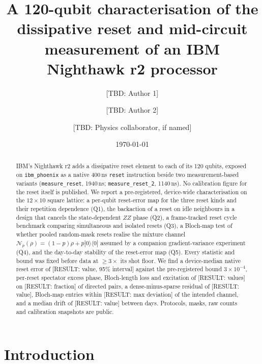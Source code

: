 \documentclass[aps,pra,reprint,superscriptaddress,nofootinbib,longbibliography,amsmath,amssymb]{revtex4-2}
\newcommand{\placeholder}[1]{\textcolor{red!70!black}{[RESULT: #1]}}
\newcommand{\tbd}[1]{\textcolor{orange!80!black}{[TBD: #1]}}
\newcommand{\Np}{\mathcal{N}_p}
\begin{document}
\title{A 120-qubit characterisation of the dissipative reset and mid-circuit measurement of an IBM Nighthawk r2 processor}

\author{\tbd{Author 1}}
\author{\tbd{Author 2}}
\author{\tbd{Physics collaborator, if named}}
\affiliation{\tbd{affiliation}}
\date{\today}

\begin{abstract}
IBM's Nighthawk r2 adds a dissipative reset element to each of its 120 qubits, exposed on \texttt{ibm\_phoenix} as a native 400\,ns \texttt{reset} instruction beside two measurement-based variants (\texttt{measure\_reset}, 1940\,ns; \texttt{measure\_reset\_2}, 1140\,ns). No calibration figure for the reset itself is published. We report a pre-registered, device-wide characterisation on the $12\times10$ square lattice: a per-qubit reset-error map for the three reset kinds and their repetition dependence (Q1), the backaction of a reset on idle neighbours in a design that cancels the state-dependent $ZZ$ phase (Q2), a frame-tracked reset cycle benchmark comparing simultaneous and isolated resets (Q3), a Bloch-map test of whether pooled random-mask resets realise the mixture channel $\Np(\rho) = (1-p)\rho + p|0\rangle\langle0|$ assumed by a companion gradient-variance experiment (Q4), and the day-to-day stability of the reset-error map (Q5). Every statistic and bound was fixed before data at $\geq 3\times$ its shot floor. We find a device-median native reset error of \placeholder{value, 95\% interval} against the pre-registered bound $3\times10^{-4}$, per-reset spectator excess phase, Bloch-length loss and excitation of \placeholder{values} on \placeholder{fraction} of directed pairs, a dense-minus-sparse residual of \placeholder{value}, Bloch-map entries within \placeholder{max deviation} of the intended channel, and a median drift of \placeholder{value} between days. Protocols, masks, raw counts and calibration snapshots are public.
\end{abstract}

\maketitle

\section{Introduction}\label{sec:intro}
\end{document}

